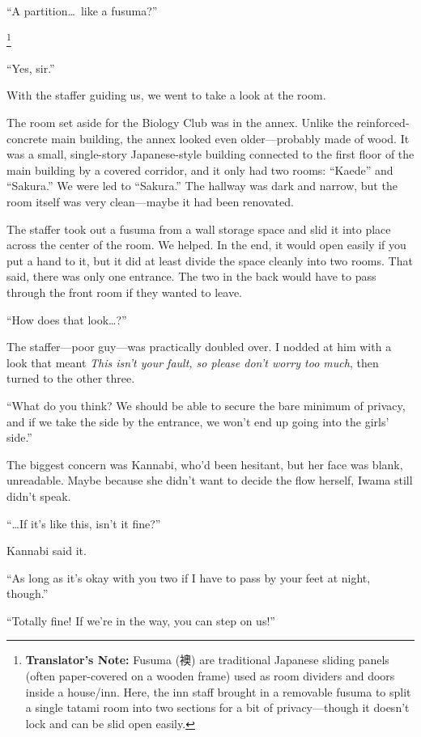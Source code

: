 \documentclass[
    a4paper,
    12pt,
    twoside,
    openany,
    UTF8,
    fontset=windows
]{ctexbook}
\begin{document}
``A partition\dots\ like a fusuma?''

\footnote{\textbf{Translator's Note:} Fusuma (襖) are traditional Japanese sliding panels (often paper-covered on a wooden frame) used as room dividers and doors inside a house/inn. Here, the inn staff brought in a removable fusuma to split a single tatami room into two sections for a bit of privacy---though it doesn't lock and can be slid open easily.}

``Yes, sir.''

With the staffer guiding us, we went to take a look at the room.

The room set aside for the Biology Club was in the annex. Unlike the reinforced-concrete main building, the annex looked even older---probably made of wood. It was a small, single-story Japanese-style building connected to the first floor of the main building by a covered corridor, and it only had two rooms: ``Kaede'' and ``Sakura.'' We were led to ``Sakura.'' The hallway was dark and narrow, but the room itself was very clean---maybe it had been renovated.

The staffer took out a fusuma from a wall storage space and slid it into place across the center of the room. We helped. In the end, it would open easily if you put a hand to it, but it did at least divide the space cleanly into two rooms. That said, there was only one entrance. The two in the back would have to pass through the front room if they wanted to leave.

``How does that look\dots?''

The staffer---poor guy---was practically doubled over. I nodded at him with a look that meant \textit{This isn't your fault, so please don't worry too much}, then turned to the other three.

``What do you think? We should be able to secure the bare minimum of privacy, and if we take the side by the entrance, we won't end up going into the girls' side.''

The biggest concern was Kannabi, who'd been hesitant, but her face was blank, unreadable. Maybe because she didn't want to decide the flow herself, Iwama still didn't speak.

``\dots If it's like this, isn't it fine?''

Kannabi said it.

``As long as it's okay with you two if I have to pass by your feet at night, though.''

``Totally fine! If we're in the way, you can step on us!''
\end{document}
